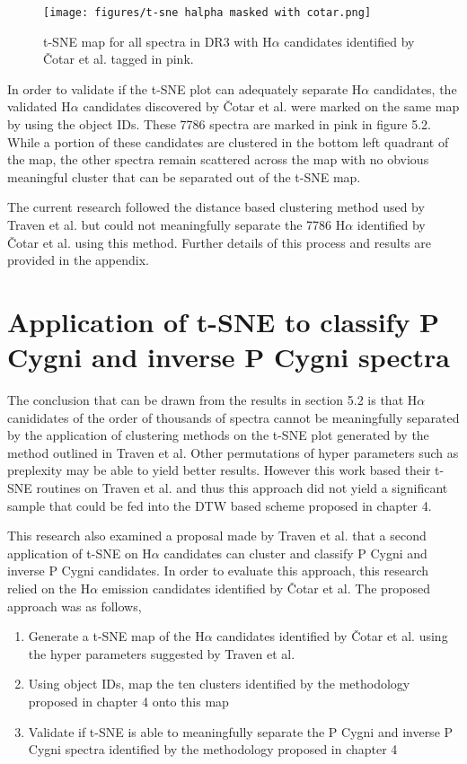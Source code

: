 \begin{figure}[t]
\centering
\texttt{[image: figures/t-sne halpha masked with cotar.png]}
\caption{t-SNE map for all spectra in DR3 with H$\alpha$ candidates identified by Čotar et al. tagged in pink.}
\end{figure}

In order to validate if the t-SNE plot can adequately separate H$\alpha$ candidates, the validated H$\alpha$ candidates discovered by Čotar et al. \cite{vcotar2021galah} were marked on the same map by using the object IDs. These 7786 spectra are marked in pink in figure 5.2. While a portion of these candidates are clustered in the bottom left quadrant of the map, the other spectra remain scattered across the map with no obvious meaningful cluster that can be separated out of the t-SNE map. 

The current research followed the distance based clustering method used by Traven et al. but could not meaningfully separate the 7786 H$\alpha$ identified by Čotar et al. using this method. Further details of this process and results are provided in the appendix.

\section{Application of t-SNE to classify P Cygni and inverse P Cygni spectra}

The conclusion that can be drawn from the results in section 5.2 is that H$\alpha$ canididates of the order of thousands of spectra cannot be meaningfully separated by the application of clustering methods on the t-SNE plot generated by the method outlined in Traven et al. Other permutations of hyper parameters such as preplexity may be able to yield better results. However this work based their t-SNE routines on Traven et al. and thus this approach did not yield a significant sample that could be fed into the DTW based scheme proposed in chapter 4. 

This research also examined a proposal made by Traven et al. that a second application of t-SNE on H$\alpha$ candidates can cluster and classify P Cygni and inverse P Cygni candidates. In order to evaluate this approach, this research relied on the H$\alpha$ emission candidates identified by Čotar et al. The proposed approach was as follows,

\begin{enumerate}
    \item Generate a t-SNE map of the H$\alpha$ candidates identified by Čotar et al. using the hyper parameters suggested by Traven et al.
    \item Using object IDs, map the ten clusters identified by the methodology proposed in chapter 4 onto this map
    \item Validate if t-SNE is able to meaningfully separate the P Cygni and inverse P Cygni spectra identified by the methodology proposed in chapter 4
\end{enumerate}


